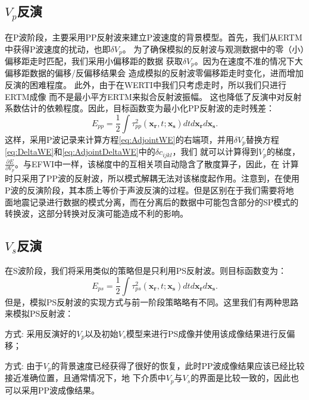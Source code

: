 \subsection{$V_p$反演}
在P波阶段，主要采用PP反射波来建立P波速度的背景模型。首先，我们从ERTM中获得P波速度的扰动，也即$\delta V_p$。
为了确保模拟的反射波与观测数据中的零（小）偏移距走时匹配，我们采用小偏移距的数据
获取$\delta V_p$。因为在速度不准的情况下大偏移距数据的偏移/反偏移结果会
造成模拟的反射波零偏移距走时变化，进而增加反演的困难程度。
此外，由于在WERTI中我们只考虑走时，所以我们只进行ERTM成像
而不是最小平方ERTM来拟合反射波振幅。
这也降低了反演中对反射系数估计的依赖程度。因此，目标函数变为最小化PP反射波的走时残差：
\begin{equation}
    E_{pp}=\frac{1}{2}\int\tau^2_{pp}(\mathbf{x_r},t;\mathbf{x_s})dtd\mathbf{x_r}d\mathbf{x_s}.
    \label{eq:ObjectivefunctionPP} 
\end{equation}
这样，采用P波记录来计算方程\eqref{eq:AdjointWE}的右端项，并用$\delta V_p$替换方程\eqref{eq:DeltaWE}和\eqref{eq:AdjointDeltaWE}中的$\delta c_{ijkl}$，我们
就可以计算得到$V_p$的梯度， $\frac{\partial E}{\partial V_p}$。与EFWI中一样，该梯度中的互相关项自动隐含了散度算子，因此，在
计算时只采用了PP波的反射波，所以模式解耦无法对该梯度起作用。注意到，在使用P波的反演阶段，其本质上等价于声波反演的过程。但是区别在于我们需要将地
面地震记录进行数据的模式分离，而在分离后的数据中可能包含部分的SP模式的转换波，这部分转换对反演可能造成不利的影响。

\subsection{$V_s$反演}
在S波阶段，我们将采用类似的策略但是只利用PS反射波。则目标函数变为：
\begin{equation}
    E_{ps}=\frac{1}{2}\int\tau^2_{ps}(\mathbf{x_r},t;\mathbf{x_s})dtd\mathbf{x_r}d\mathbf{x_s}.
    \label{eq:ObjectivefunctionPS} 
\end{equation}
但是，模拟PS反射波的实现方式与前一阶段策略略有不同。这里我们有两种思路来模拟PS反射波：

方式\uppercase\expandafter{}: 采用反演好的$V_p$以及初始$V_s$模型来进行PS成像并使用该成像结果进行反偏移；

方式\uppercase\expandafter{}: 由于$V_p$的背景速度已经获得了很好的恢复，此时PP波成像结果应该已经比较接近准确位置，且通常情况下，地
下介质中$V_p$与$V_s$的界面是比较一致的，因此也可以采用PP波成像结果。


